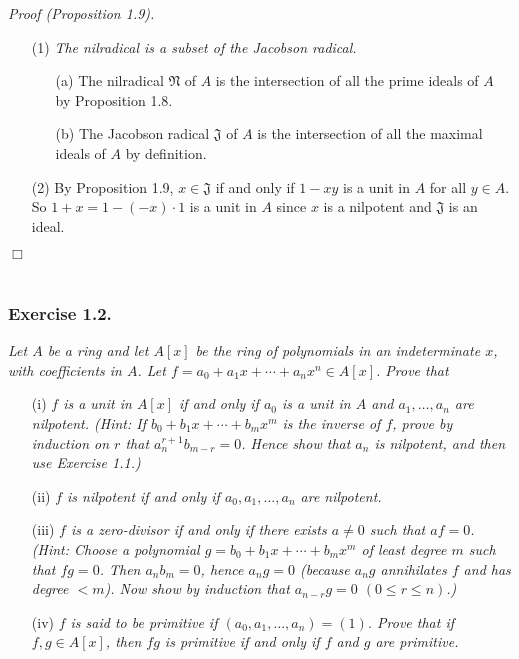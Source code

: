 \documentclass{article}
\begin{document}
\emph{Proof (Proposition 1.9).}
\begin{enumerate}
\item[(1)]
  \emph{The nilradical is a subset of the Jacobson radical.}
  \begin{enumerate}
  \item[(a)]
    The nilradical $\mathfrak{N}$ of $A$ is the intersection of all the prime ideals of $A$
    by Proposition 1.8.
  \item[(b)]
    The Jacobson radical $\mathfrak{J}$ of $A$ is
    the intersection of all the maximal ideals of $A$
    by definition.
  \end{enumerate}

\item[(2)]
  By Proposition 1.9,
  $x \in \mathfrak{J}$ if and only if
  $1-xy$ is a unit in $A$ for all $y \in A$.
  So $1+x = 1 - (-x) \cdot 1$ is a unit in $A$
  since $x$ is a nilpotent and $\mathfrak{J}$ is an ideal.
\end{enumerate}
$\Box$ \\\\






\subsubsection*{Exercise 1.2.}
\emph{Let $A$ be a ring and
let $A[x]$ be the ring of polynomials in an indeterminate $x$,
with coefficients in $A$.
Let $f = a_0 + a_1 x + \cdots + a_n x^n \in A[x]$.
Prove that}
\begin{enumerate}
\item[(i)]
  \emph{$f$ is a unit in $A[x]$ if and only if
  $a_0$ is a unit in $A$ and
  $a_1, \ldots, a_n$ are nilpotent.
  (Hint: If $b_0 + b_1 x + \cdots + b_m x^m$ is the inverse of $f$,
  prove by induction on $r$ that $a_n^{r+1} b_{m-r} = 0$.
  Hence show that $a_n$ is nilpotent, and then use Exercise 1.1.)}

\item[(ii)]
  \emph{$f$ is nilpotent if and only if
  $a_0, a_1, \ldots, a_n$ are nilpotent.}

\item[(iii)]
  \emph{$f$ is a zero-divisor if and only if
  there exists $a \neq 0$ such that $af = 0$.
  (Hint: Choose a polynomial $g = b_0 + b_1 x + \cdots + b_m x^m$
  of least degree $m$ such that $fg = 0$.
  Then $a_n b_m = 0$, hence $a_n g = 0$
  (because $a_n g$ annihilates $f$ and has degree $< m$).
  Now show by induction that $a_{n-r}g = 0$ $(0 \leq r \leq n)$.)}

\item[(iv)]
  \emph{$f$ is said to be primitive if $(a_0, a_1, \ldots, a_n) = (1)$.
  Prove that if $f, g \in A[x]$, then $fg$ is primitive if and only if
  $f$ and $g$ are primitive.} \\
\end{enumerate}
\end{document}
